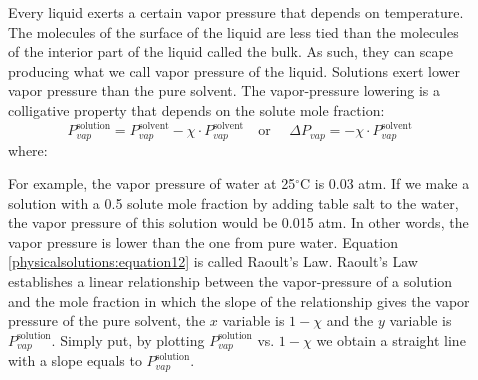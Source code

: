 \documentclass[main.tex]{subfiles}
\newcommand\chapterlabel{physicalsolutions}
\begin{document}
\begin{description}
\item[] 
Every liquid exerts a certain vapor pressure that depends on temperature. The molecules of the surface of the liquid are less tied than the molecules of the interior part of the liquid called the bulk. As such, they can scape producing what we call vapor pressure of the liquid. Solutions exert lower vapor pressure than the pure solvent. The vapor-pressure lowering is a colligative property that depends on the solute mole fraction:
\begin{equation}
\boxed{ P_{vap}^{\text{solution}}=P_{vap}^{\text{solvent}} -  \chi \cdot P_{vap}^{\text{solvent}} 	}
\quad  \text{or }\quad 
\boxed{\Delta P_{vap} =  -  \chi \cdot P_{vap}^{\text{solvent}}  }
\label{\chapterlabel:equation12}
\end{equation}
where:
For example, the vapor pressure of water at 25$^{\circ}$C  is 0.03 atm. If we make a solution with a 0.5 solute mole fraction by adding table salt to the water, the vapor pressure of this solution would be 0.015 atm. In other words, the vapor pressure is lower than the one from pure water.  Equation \ref{\chapterlabel:equation12} is called Raoult's Law.
Raoult's Law establishes a linear relationship between the vapor-pressure of a solution and the mole fraction in which the slope of the relationship gives the vapor pressure of the pure solvent, the $x$ variable is $1-\chi$ and the $y$ variable is $P_{vap}^{\text{solution}}$. Simply put, by plotting $P_{vap}^{\text{solution}}$ vs. $1-\chi$ we obtain a straight line with a slope equals to $P_{vap}^{\text{solution}}$.



\end{description}
\end{document}
